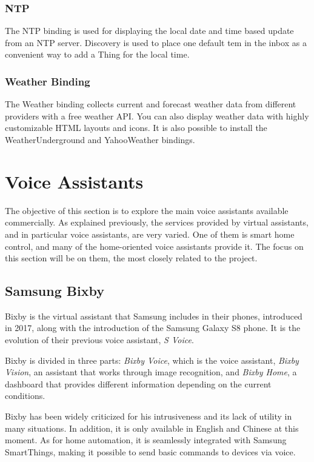 \subsubsection{NTP}
The NTP binding is used for displaying the local date and time based update from an NTP server. Discovery is used to place one default
tem in the inbox as a convenient way to add a Thing for the local time.

\subsubsection{Weather Binding}
The Weather binding collects current and forecast weather data from different providers with a free weather API. You can also display
weather data with highly customizable HTML layouts and icons. It is also possible to install the WeatherUnderground and YahooWeather
bindings.

\bigskip
\section{Voice Assistants}
The objective of this section is to explore the main voice assistants available commercially. As explained previously, the services
provided by virtual assistants, and in particular voice assistants, are very varied. One of them is smart home control, and many of
the home-oriented voice assistants provide it. The focus on this section will be on them, the most closely related to the project.

\subsection{Samsung Bixby}
Bixby is the virtual assistant that Samsung includes in their phones, introduced in 2017, along with the introduction of the Samsung
Galaxy S8 phone. It is the evolution of their previous voice assistant, \textit{S Voice}.

Bixby is divided in three parts: \textit{Bixby Voice}, which is the voice assistant, \textit{Bixby Vision}, an assistant that works through
image recognition, and \textit{Bixby Home}, a dashboard that provides different information depending on the current
conditions.\cite{samsungBixby}

Bixby has been widely criticized for his intrusiveness and its lack of utility in many situations. In addition, it is only available in English
and Chinese at this moment. As for home automation, it is seamlessly integrated with Samsung SmartThings, making it possible to send
basic commands to devices via voice.

